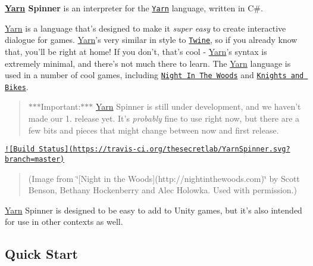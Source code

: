 

{\bfseries \hyperlink{a00026}{Yarn} Spinner} is an interpreter for the \href{https://github.com/infiniteammoinc/Yarn}{\tt Yarn} language, written in C\#.

\hyperlink{a00026}{Yarn} is a language that's designed to make it {\itshape super easy} to create interactive dialogue for games. \hyperlink{a00026}{Yarn}'s very similar in style to \href{http://twinery.org}{\tt Twine}, so if you already know that, you'll be right at home! If you don't, that's cool -\/ \hyperlink{a00026}{Yarn}'s syntax is extremely minimal, and there's not much there to learn. The \hyperlink{a00026}{Yarn} language is used in a number of cool games, including \href{http://nightinthewoods.com}{\tt Night In The Woods} and \href{https://www.kickstarter.com/projects/foamsword/knights-and-bikes}{\tt Knights and Bikes}.

\begin{quotation}
$\ast$$\ast$$\ast$\-Important\-:$\ast$$\ast$$\ast$ \hyperlink{a00026}{Yarn} Spinner is still under development, and we haven't made our 1. release yet. It's {\itshape probably} fine to use right now, but there are a few bits and pieces that might change between now and first release.

\end{quotation}


\href{https://travis-ci.org/thesecretlab/YarnSpinner}{\tt !\mbox{[}Build Status\mbox{]}(https\-://travis-\/ci.\-org/thesecretlab/\-Yarn\-Spinner.\-svg?branch=master)}



\begin{quotation}
(Image from \char`\"{}\mbox{[}\-Night in the Woods\mbox{]}(http\-://nightinthewoods.\-com)\char`\"{} by Scott Benson, Bethany Hockenberry and Alec Holowka. Used with permission.)

\end{quotation}


\hyperlink{a00026}{Yarn} Spinner is designed to be easy to add to Unity games, but it's also intended for use in other contexts as well.

\subsection*{Quick Start}


